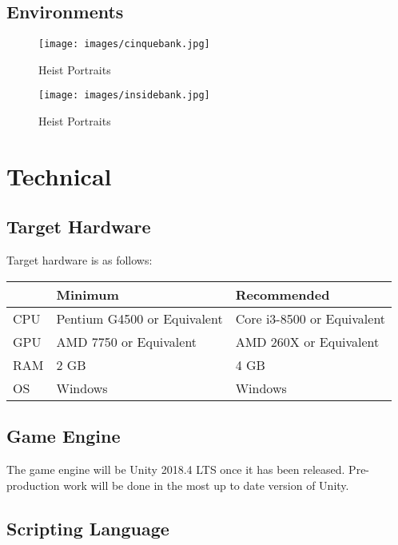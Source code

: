 \documentclass[10pt]{report}
\begin{document}
\section{Environments}

\begin{figure}[H]
    \centering
	\texttt{[image: images/cinquebank.jpg]}
    \caption{Heist Portraits}
\end{figure}

\begin{figure}[H]
    \centering
	\texttt{[image: images/insidebank.jpg]}
    \caption{Heist Portraits}
\end{figure}


\chapter{Technical}

\section{Target Hardware}

Target hardware is as follows:

\begin{center}
    \begin{tabular}{|l|l|l|}
        \hline
        & Minimum & Recommended \\ \hline
        CPU & Pentium G4500 or Equivalent & Core i3-8500 or Equivalent \\ \hline
        GPU & AMD 7750 or Equivalent & AMD 260X or Equivalent \\ \hline
        RAM & 2 GB & 4 GB \\ \hline
        OS & Windows & Windows \\
        \hline
    \end{tabular}
\end{center}

\section{Game Engine}

The game engine will be Unity 2018.4 LTS once it has been released. Pre-production work will be done in the most up to date version of Unity.

\section{Scripting Language}
\end{document}
